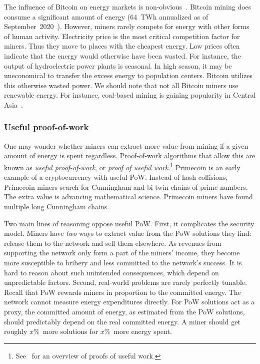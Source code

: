 The influence of Bitcoin on energy markets is non-obvious~\cite{Carter2020}.
Bitcoin mining does consume a significant amount of energy ($64$~TWh annualized as of September~2020~\cite{Rauchs2020}).
However, miners rarely compete for energy with other forms of human activity.
Electricity price is the most critical competition factor for miners.
Thus they move to places with the cheapest energy.
Low prices often indicate that the energy would otherwise have been wasted.
For instance, the output of hydroelectric power plants is seasonal.
In high season, it may be uneconomical to transfer the excess energy to population centers.
Bitcoin utilizes this otherwise wasted power.
We should note that not all Bitcoin miners use renewable energy.
For instance, coal-based mining is gaining popularity in Central Asia~\cite{8BTCStaff2020}.


\subsubsection*{Useful proof-of-work}

One may wonder whether miners can extract more value from mining if a given amount of energy is spent regardless.
Proof-of-work algorithms that allow this are known as \textit{useful proof-of-work}, or \textit{proof of useful work}.\footnote{See~\cite{Ball2017} for an overview of proofs of useful work.}
Primecoin is an early example of a cryptocurrency with useful PoW.
Instead of hash collisions, Primecoin miners search for Cunningham and bi-twin chains of prime numbers.
The extra value is advancing mathematical science.
Primecoin miners have found multiple long Cunningham chains.

Two main lines of reasoning oppose useful PoW.
First, it complicates the security model.
Miners have \textit{two} ways to extract value from the PoW solutions they find: release them to the network and sell them elsewhere.
As revenues from supporting the network only form a part of the miners' income, they become more susceptible to bribery and less committed to the network's success.
It is hard to reason about such unintended consequences, which depend on unpredictable factors.
Second, real-world problems are rarely perfectly tunable.
Recall that PoW rewards miners in proportion to the committed energy.
The network cannot measure energy expenditures directly.
For PoW solutions act as a proxy, the committed amount of energy, as estimated from the PoW solutions, should predictably depend on the real committed energy.
A miner should get roughly $x\%$~more solutions for $x\%$~more energy spent.

